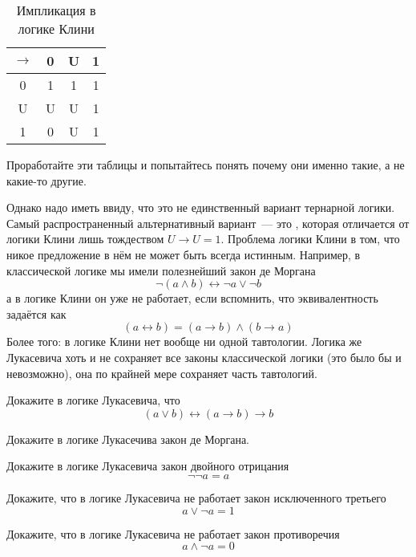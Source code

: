 \begin{table}[h]
\centering
\begin{tabular}{c | c c c}
$\to$ & 0& U& 1 \\
\hline
0 & 1 & 1 & 1 \\
U & U & U & 1\\
1 & 0 & U & 1
\end{tabular}
\caption{Импликация в логике Клини}\label{table:kleene-or}
\end{table}

Проработайте эти таблицы и попытайтесь понять почему они именно такие, а не какие-то другие.

Однако надо иметь ввиду, что это не единственный вариант тернарной логики. Самый распространенный альтернативный вариант~--- это , которая отличается от логики Клини лишь тождеством $U\to U = 1$. Проблема логики Клини в том, что никое предложение в нём не может быть всегда истинным. Например, в классической логике мы имели полезнейший закон де Моргана
$$\neg(a \land b) \leftrightarrow \neg a \lor \neg b$$
а в логике Клини он уже не работает, если вспомнить, что эквивалентность задаётся как
$$(a \leftrightarrow b) = (a\to b)\land (b\to a)$$
Более того: в логике Клини нет вообще ни одной тавтологии. Логика же Лукасевича хоть и не сохраняет все законы классической логики (это было бы и невозможно), она по крайней мере сохраняет часть тавтологий.

\begin{exercise}
Докажите в логике Лукасевича, что
$$(a\lor b) \leftrightarrow (a \to b) \to b$$
\end{exercise}

\begin{exercise}
Докажите в логике Лукасечива закон де Моргана.
\end{exercise}

\begin{exercise}
Докажите в логике Лукасевича закон двойного отрицания
$$\neg\neg a = a$$
\end{exercise}

\begin{exercise}
Докажите, что в логике Лукасевича не работает закон исключенного третьего
$$a\lor \neg a = 1$$
\end{exercise}

\begin{exercise}
Докажите, что в логике Лукасевича не работает закон противоречия
$$a\land \neg a = 0$$
\end{exercise}

